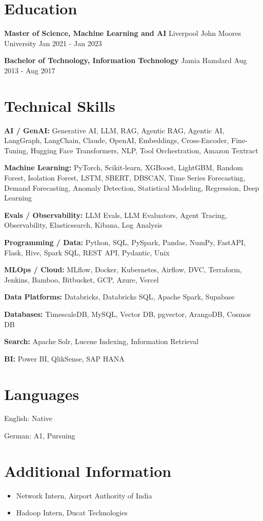 \documentclass[10pt,a4paper]{article}
\begin{document}
\section{Education}
\textbf{Master of Science, Machine Learning and AI} \textbar{} Liverpool John Moores University \hfill Jan 2021 - Jan 2023\par
\textbf{Bachelor of Technology, Information Technology} \textbar{} Jamia Hamdard \hfill Aug 2013 - Aug 2017\par

\section{Technical Skills}
\textbf{AI / GenAI:} Generative AI, LLM, RAG, Agentic RAG, Agentic AI, LangGraph, LangChain, Claude, OpenAI, Embeddings, Cross-Encoder, Fine-Tuning, Hugging Face Transformers, NLP, Tool Orchestration, Amazon Textract\par
\textbf{Machine Learning:} PyTorch, Scikit-learn, XGBoost, LightGBM, Random Forest, Isolation Forest, LSTM, SBERT, DBSCAN, Time Series Forecasting, Demand Forecasting, Anomaly Detection, Statistical Modeling, Regression, Deep Learning\par
\textbf{Evals / Observability:} LLM Evals, LLM Evaluators, Agent Tracing, Observability, Elasticsearch, Kibana, Log Analysis\par
\textbf{Programming / Data:} Python, SQL, PySpark, Pandas, NumPy, FastAPI, Flask, Hive, Spark SQL, REST API, Pydantic, Unix\par
\textbf{MLOps / Cloud:} MLflow, Docker, Kubernetes, Airflow, DVC, Terraform, Jenkins, Bamboo, Bitbucket, GCP, Azure, Vercel\par
\textbf{Data Platforms:} Databricks, Databricks SQL, Apache Spark, Supabase\par
\textbf{Databases:} TimescaleDB, MySQL, Vector DB, pgvector, ArangoDB, Cosmos DB\par
\textbf{Search:} Apache Solr, Lucene Indexing, Information Retrieval\par
\textbf{BI:} Power BI, QlikSense, SAP HANA\par

\section{Languages}
English: Native\par
German: A1, Pursuing\par

\section{Additional Information}
\begin{itemize}
  \item Network Intern, Airport Authority of India
  \item Hadoop Intern, Ducat Technologies
\end{itemize}
\end{document}
